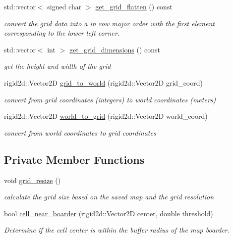 \begin{DoxyCompactItemize}
std\+::vector$<$ signed char $>$ \hyperlink{classgrid_1_1Grid_a7c05ad9408e0ff99e36a3196136f3bb7}{get\+\_\+grid\+\_\+flatten} () const
\begin{DoxyCompactList}\small\item\em convert the grid data into a in row major order with the first element corresponding to the lower left corner. \end{DoxyCompactList}\item 
std\+::vector$<$ int $>$ \hyperlink{classgrid_1_1Grid_ab5da2712457e615bb12ca6d5fc1f1b9d}{get\+\_\+grid\+\_\+dimensions} () const
\begin{DoxyCompactList}\small\item\em get the height and width of the grid \end{DoxyCompactList}\item 
rigid2d\+::\+Vector2D \hyperlink{classgrid_1_1Grid_a740d72189efbdf5595c3ddaacc8cdfc4}{grid\+\_\+to\+\_\+world} (rigid2d\+::\+Vector2D grid\+\_\+coord)
\begin{DoxyCompactList}\small\item\em convert from grid coordinates (integers) to world coordinates (meters) \end{DoxyCompactList}\item 
rigid2d\+::\+Vector2D \hyperlink{classgrid_1_1Grid_a9aeb33485b294ab4a07178359db6e3cf}{world\+\_\+to\+\_\+grid} (rigid2d\+::\+Vector2D world\+\_\+coord)
\begin{DoxyCompactList}\small\item\em convert from world coordinates to grid coordinates \end{DoxyCompactList}\end{DoxyCompactItemize}
\subsection*{Private Member Functions}
\begin{DoxyCompactItemize}
\item 
\mbox{\label{classgrid_1_1Grid_af5dd6a34ea30b975c4e72304db4e6dc7}} 
void \hyperlink{classgrid_1_1Grid_af5dd6a34ea30b975c4e72304db4e6dc7}{grid\+\_\+resize} ()
\begin{DoxyCompactList}\small\item\em calculate the grid size based on the saved map and the grid resolution \end{DoxyCompactList}\item 
bool \hyperlink{classgrid_1_1Grid_a5b8625b7400116c5707c0465467a597d}{cell\+\_\+near\+\_\+boarder} (rigid2d\+::\+Vector2D center, double threshold)
\begin{DoxyCompactList}\small\item\em Determine if the cell center is within the buffer radius of the map boarder. \end{DoxyCompactList}\end{DoxyCompactItemize}
